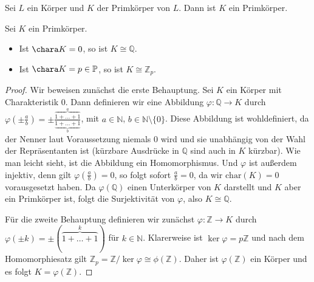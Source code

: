 \begin{remark}
    Sei $L$ ein Körper und $K$ der Primkörper von $L$. Dann ist $K$ ein Primkörper.
\end{remark}

\begin{theorem} \label{theorem:primkoerper}
    Sei $K$ ein Primkörper.
    \begin{itemize}
        \item Ist $\chara K = 0$, so ist $K \cong \mathbb{Q}$.
        \item Ist $\chara K = p \in \mathbb{P}$, so ist $K \cong \mathbb{Z}_p$.
    \end{itemize}
\end{theorem}

\begin{proof}
    Wir beweisen zunächst die erste Behauptung. Sei $K$ ein Körper mit Charakteristik $0$.
    Dann definieren wir eine Abbildung $\varphi:\mathbb{Q}\to K$ durch $\varphi(\pm\frac{a}{b})=\pm\frac{\overbrace{1+\ldots+1}^{a}}{\underbrace{1+\ldots+1}_{b}}$,
    mit $a\in \mathbb{N}$, $b\in\mathbb{N}\setminus\{0\}$. Diese Abbildung ist wohldefiniert,
    da der Nenner laut Voraussetzung niemals $0$ wird und sie unabhängig von der Wahl der Repräsentanten ist
    (kürzbare Ausdrücke in $\mathbb{Q}$ sind auch in $K$ kürzbar).
    Wie man leicht sieht, ist die Abbildung ein Homomorphismus. Und $\varphi$ ist außerdem injektiv, denn gilt
    $\varphi(\frac{a}{b})=0$, so folgt sofort $\frac{a}{b}=0$, da wir $\mathrm{char}(K)=0$ vorausgesetzt haben.
    Da $\varphi(\mathbb{Q})$ einen Unterkörper von $K$ darstellt und $K$ aber ein Primkörper ist, folgt die Surjektivität von $\varphi$,
    also $K\cong \mathbb{Q}$.

    Für die zweite Behauptung definieren wir zunächst $\varphi:\mathbb{Z}\to K$ durch $\varphi(\pm k)=\pm(\overbrace{1+\ldots+1}^{k})$ für $k\in \mathbb{N}$. Klarerweise ist $\ker\varphi=p\mathbb{Z}$ und nach dem Homomorphiesatz gilt $\mathbb{Z}_p=\mathbb{Z}/\ker\varphi\cong \phi(\mathbb{Z})$. Daher ist $\varphi(\mathbb{Z})$ ein Körper und es folgt $K=\varphi(\mathbb{Z})$.
\end{proof}